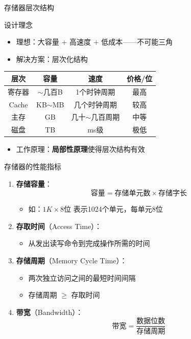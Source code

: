 \documentclass[10pt, aspectratio=169]{beamer}
\begin{document}
\begin{frame}{存储器层次结构}
    \begin{block}{设计理念}
        \begin{itemize}
            \item 理想：大容量 + 高速度 + 低成本——不可能三角
            \item 解决方案：层次化结构
        \end{itemize}
    \end{block}
    \vspace{0.3em}
    \begin{center}
        \begin{tabular}{|c|c|c|c|}
            \hline
            \textbf{层次} & \textbf{容量} & \textbf{速度} & \textbf{价格/位} \\
            \hline
            寄存器 & $\sim$几百B & 1个时钟周期 & 最高 \\
            \hline
            Cache & KB$\sim$MB & 几个时钟周期 & 较高 \\
            \hline
            主存 & GB & 几十$\sim$几百周期 & 中等 \\
            \hline
            磁盘 & TB & ms级 & 极低 \\
            \hline
        \end{tabular}
    \end{center}
    \vspace{0.3em}
    \begin{itemize}
        \item 工作原理：\textbf{局部性原理}使得层次结构有效
    \end{itemize}
\end{frame}

\begin{frame}{存储器的性能指标}
    \begin{enumerate}
        \item \textbf{存储容量}：
        \[
            \text{容量} = \text{存储单元数} \times \text{存储字长}
        \]
        \begin{itemize}
            \item 如：$1K \times 8$位 表示1024个单元，每单元8位
        \end{itemize}
        \item \textbf{存取时间}（Access Time）：
        \begin{itemize}
            \item 从发出读写命令到完成操作所需的时间
        \end{itemize}
        \item \textbf{存储周期}（Memory Cycle Time）：
        \begin{itemize}
            \item 两次独立访问之间的最短时间间隔
            \item 存储周期 $\ge$ 存取时间
        \end{itemize}
        \item \textbf{带宽}（Bandwidth）：
        \[
            \text{带宽} = \frac{\text{数据位数}}{\text{存储周期}}
        \]
    \end{enumerate}
\end{frame}
\end{document}
